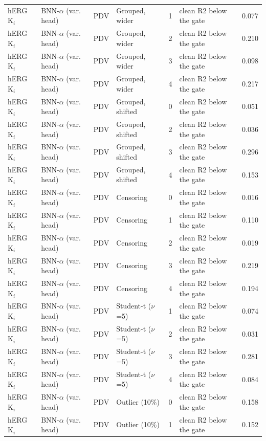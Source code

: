 {\begin{longtable}{llllcll}
hERG K$_i$ & BNN-$\alpha$ (var. head) & PDV & Grouped, wider & 1 & clean R2 below the gate & 0.077 \\
hERG K$_i$ & BNN-$\alpha$ (var. head) & PDV & Grouped, wider & 2 & clean R2 below the gate & 0.210 \\
hERG K$_i$ & BNN-$\alpha$ (var. head) & PDV & Grouped, wider & 3 & clean R2 below the gate & 0.098 \\
hERG K$_i$ & BNN-$\alpha$ (var. head) & PDV & Grouped, wider & 4 & clean R2 below the gate & 0.217 \\
hERG K$_i$ & BNN-$\alpha$ (var. head) & PDV & Grouped, shifted & 0 & clean R2 below the gate & 0.051 \\
hERG K$_i$ & BNN-$\alpha$ (var. head) & PDV & Grouped, shifted & 2 & clean R2 below the gate & 0.036 \\
hERG K$_i$ & BNN-$\alpha$ (var. head) & PDV & Grouped, shifted & 3 & clean R2 below the gate & 0.296 \\
hERG K$_i$ & BNN-$\alpha$ (var. head) & PDV & Grouped, shifted & 4 & clean R2 below the gate & 0.153 \\
hERG K$_i$ & BNN-$\alpha$ (var. head) & PDV & Censoring & 0 & clean R2 below the gate & 0.016 \\
hERG K$_i$ & BNN-$\alpha$ (var. head) & PDV & Censoring & 1 & clean R2 below the gate & 0.110 \\
hERG K$_i$ & BNN-$\alpha$ (var. head) & PDV & Censoring & 2 & clean R2 below the gate & 0.019 \\
hERG K$_i$ & BNN-$\alpha$ (var. head) & PDV & Censoring & 3 & clean R2 below the gate & 0.219 \\
hERG K$_i$ & BNN-$\alpha$ (var. head) & PDV & Censoring & 4 & clean R2 below the gate & 0.194 \\
hERG K$_i$ & BNN-$\alpha$ (var. head) & PDV & Student-t ($\nu$=5) & 1 & clean R2 below the gate & 0.074 \\
hERG K$_i$ & BNN-$\alpha$ (var. head) & PDV & Student-t ($\nu$=5) & 2 & clean R2 below the gate & 0.031 \\
hERG K$_i$ & BNN-$\alpha$ (var. head) & PDV & Student-t ($\nu$=5) & 3 & clean R2 below the gate & 0.281 \\
hERG K$_i$ & BNN-$\alpha$ (var. head) & PDV & Student-t ($\nu$=5) & 4 & clean R2 below the gate & 0.084 \\
hERG K$_i$ & BNN-$\alpha$ (var. head) & PDV & Outlier (10\%) & 0 & clean R2 below the gate & 0.158 \\
hERG K$_i$ & BNN-$\alpha$ (var. head) & PDV & Outlier (10\%) & 1 & clean R2 below the gate & 0.152 \\

\end{longtable}}
